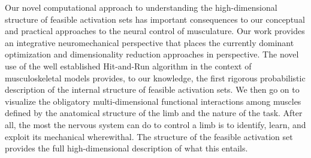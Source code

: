 Our novel computational approach to understanding the high-dimensional structure of feasible activation sets has important consequences to our conceptual and practical approaches to the neural control of musculature.  Our work provides an integrative neuromechanical perspective that places the currently dominant optimization and dimensionality reduction approaches in perspective. The novel use of the well established Hit-and-Run algorithm in the context of musculoskeletal models provides, to our knowledge, the first  rigorous probabilistic description of the internal structure of feasible activation sets. We then go on to visualize the obligatory multi-dimensional functional interactions among muscles defined by the anatomical structure of the limb and the nature of the task. After all, the most the nervous system can do to control a limb is  to identify, learn, and exploit its mechanical wherewithal. The structure of the feasible activation set provides the full high-dimensional description of what this entails.


